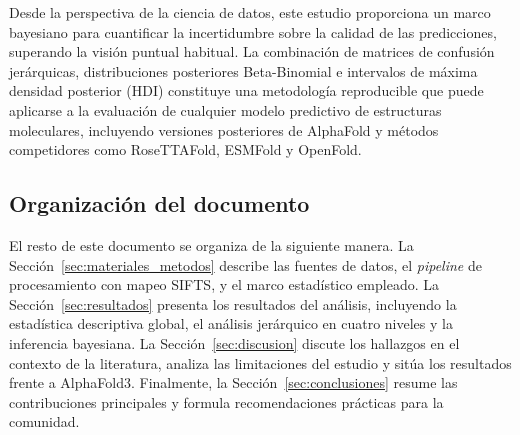 Desde la perspectiva de la ciencia de datos, este estudio proporciona un marco bayesiano para cuantificar la incertidumbre sobre la calidad de las predicciones, superando la visi\'on puntual habitual. La combinaci\'on de matrices de confusi\'on jer\'arquicas, distribuciones posteriores Beta-Binomial e intervalos de m\'axima densidad posterior (HDI) constituye una metodolog\'ia reproducible que puede aplicarse a la evaluaci\'on de cualquier modelo predictivo de estructuras moleculares, incluyendo versiones posteriores de AlphaFold y m\'etodos competidores como RoseTTAFold, ESMFold y OpenFold.

\subsection{Organizaci\'on del documento}
\label{subsec:organizacion}

El resto de este documento se organiza de la siguiente manera. La Secci\'on~\ref{sec:materiales_metodos} describe las fuentes de datos, el \textit{pipeline} de procesamiento con mapeo SIFTS, y el marco estad\'istico empleado. La Secci\'on~\ref{sec:resultados} presenta los resultados del an\'alisis, incluyendo la estad\'istica descriptiva global, el an\'alisis jer\'arquico en cuatro niveles y la inferencia bayesiana. La Secci\'on~\ref{sec:discusion} discute los hallazgos en el contexto de la literatura, analiza las limitaciones del estudio y sit\'ua los resultados frente a AlphaFold3. Finalmente, la Secci\'on~\ref{sec:conclusiones} resume las contribuciones principales y formula recomendaciones pr\'acticas para la comunidad.
